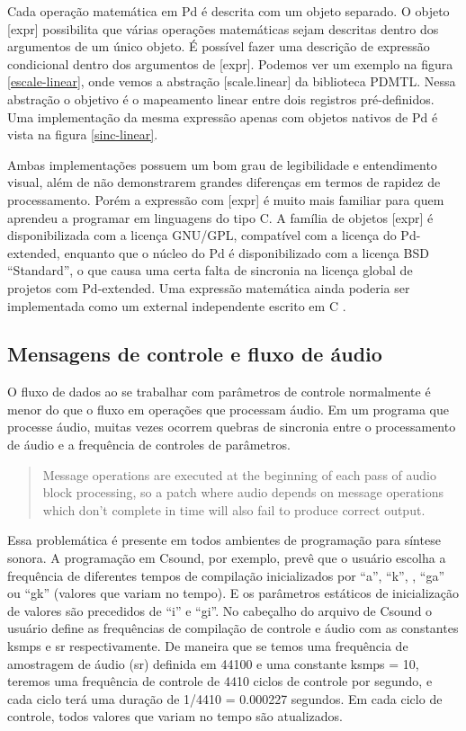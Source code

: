 \documentclass[draft]{ppgmus}
\begin{document}
Cada operação matemática em Pd é descrita com um objeto separado.
O objeto [expr] possibilita que várias operações matemáticas sejam
descritas dentro dos argumentos de um único objeto.
É possível fazer uma descrição de expressão condicional dentro
dos argumentos de [expr]. Podemos ver um exemplo na figura \ref{escale-linear},
onde vemos a abstração [scale.linear] da biblioteca PDMTL. Nessa abstração
o objetivo é o mapeamento linear entre dois registros pré-definidos. Uma
implementação da mesma expressão apenas com objetos nativos de Pd é
vista na figura \ref{sinc-linear}.

Ambas implementações possuem um bom grau de legibilidade e entendimento
visual, além de não demonstrarem grandes diferenças em termos
de rapidez de processamento. Porém a expressão com [expr] é muito mais familiar para quem aprendeu
a programar em linguagens do tipo C. A família de objetos [expr] é disponibilizada
com a licença GNU/GPL, compatível com a licença do Pd-extended, enquanto que o núcleo do Pd é 
disponibilizado com a licença BSD ``Standard'', o
que causa uma certa falta de sincronia na licença global de projetos com Pd-extended. 
Uma expressão matemática ainda poderia ser implementada
como um external independente escrito em C \cite{howtoexternal}.



\subsection{Mensagens de controle e fluxo de áudio}

O fluxo de dados ao se trabalhar com parâmetros de controle
normalmente é menor do que o fluxo em operações
que processam áudio. Em um programa que processe áudio, 
muitas vezes ocorrem quebras de sincronia entre o processamento
de áudio e a frequência de controles de parâmetros.

\begin{quote}
Message operations are executed at the beginning of each pass of audio
block processing, so a patch where audio depends on message operations
which don't complete in time will also fail to produce correct output. \cite{farnell2010designing} 
\end{quote}


Essa problemática é presente em todos ambientes de programação
para síntese sonora.
A programação em Csound, por exemplo,  prevê que o usuário escolha a frequência
de diferentes tempos de compilação inicializados por ``a'', ``k'',
, ``ga'' ou ``gk'' (valores que variam no tempo). E os parâmetros 
 estáticos de inicialização de valores são precedidos
de ``i'' e ``gi''. No cabeçalho do arquivo de Csound o usuário define as 
frequências de compilação de controle e áudio com as constantes ksmps e sr respectivamente.
De maneira que se temos uma frequência de amostragem de áudio (sr) definida em
44100 e uma constante ksmps = 10, teremos uma frequência de controle de 4410 ciclos
de controle por segundo, e cada ciclo terá uma duração de 1/4410 = 0.000227 segundos. 
Em cada ciclo de controle, todos valores que variam no tempo são atualizados.
\end{document}
